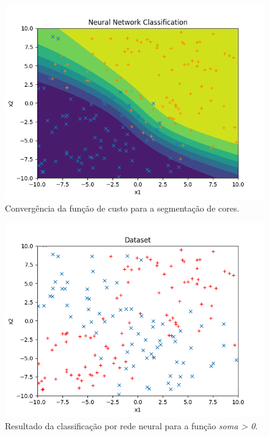 \documentclass[conference]{IEEEtran}
\begin{document}
\begin{figure}[htbp]
\centering
\centerline{\includegraphics[scale=0.5]{imagens/sum_gt_zero/nn_classification_sgz.png}}
\caption{Convergência da função de custo para a segmentação de cores.}
\label{sum_gt_zero/nn_classification_sgz}
\end{figure}

\begin{figure}[htbp]
\centering
\centerline{\includegraphics[scale=0.5]{imagens/xor/lambda_zero/dataset_xor.png}}
\caption{Resultado da classificação por rede neural para a função \textit{soma > 0}.}
\label{xor/lambda_zero/dataset_xor}
\end{figure} 
\end{document}
